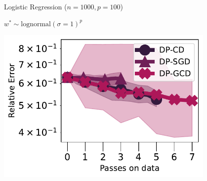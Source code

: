 \documentclass{beamer}
\begin{document}







\begin{frame}
  \begin{center}
    Logistic Regression ($n=1000,p=100$)

    $w^* \sim \text{lognormal}(\sigma=1)^p$

    \includegraphics[width=0.8\textwidth]{plots_final/lognormal_opt_1_norm.pdf}
  \end{center}
\end{frame}
\end{document}
